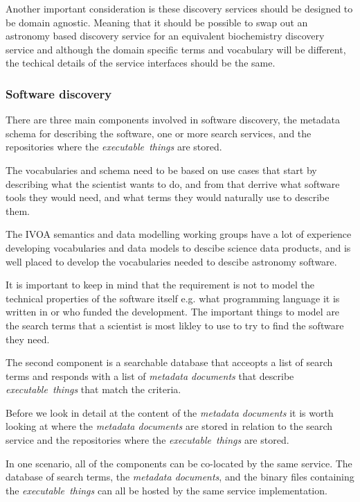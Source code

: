 \documentclass[11pt,a4paper]{ivoa}
\newcommand{\ivoa} {IVOA}
\newcommand{\executablething}[1] {\textit{executable~thing#1}}
\newcommand{\metadoc} [1]{\textit{metadata document#1}}
\newcommand{\science}[1] {science#1}
\newcommand{\scientist}[1] {scientist#1}
\begin{document}
Another important consideration is these discovery services should be designed to be domain agnostic.
Meaning that it should be possible to swap out an astronomy based discovery service
for an equivalent biochemistry discovery service and although the domain specific
terms and vocabulary will be different, the techical details of the service interfaces
should be the same.

\subsubsection{Software discovery}
\label{software-discovery}

There are three main components involved in software discovery, the metadata schema for
describing the software, one or more search services, and the
repositories where the \executablething{s} are stored.

The vocabularies and schema need to be based on use cases that start by describing what the
\scientist{} wants to do, and from that derrive what software tools they would need, and what terms
they would naturally use to describe them.

The \ivoa{} semantics and data modelling working groups have a lot of experience developing
vocabularies and data models to descibe \science{} data products, and is well placed
to develop the vocabularies needed to descibe astronomy software.

It is important to keep in mind that the requirement is not to model the technical properties
of the software itself e.g. what programming language it is written in or who funded the development.
The important things to model are the search terms that a \scientist{} is most likley to use to try to
find the software they need.

The second component is a searchable database that acceopts a list of search terms and responds with a
list of \metadoc{s} that describe \executablething{s} that match the criteria.

Before we look in detail at the content of the \metadoc{s} it is worth looking at where the \metadoc{s} are
stored in relation to the search service and the repositories where the \executablething{s} are stored.

In one scenario, all of the components can be co-located by the same service.
The database of search terms, the \metadoc{s}, and the binary files containing the \executablething{s}
can all be hosted by the same service implementation.
\end{document}
